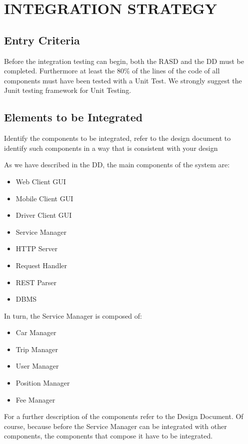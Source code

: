 \section{INTEGRATION STRATEGY}
\subsection{Entry Criteria} 
Before the integration testing can begin, both the RASD and the DD must be completed. Furthermore at least the 80\% of the lines of the code of all components must have been tested with a Unit Test. We strongly suggest the Junit testing framework for Unit Testing.
\subsection{Elements to be Integrated} Identify the components to be integrated, refer to the design document to identify such components in a way that is consistent with your design
\newline 

As we have described in the DD, the main components of the system are:
\begin{itemize}
\item Web Client GUI
\item Mobile Client GUI
\item Driver Client GUI
\item Service Manager 
\item HTTP Server
\item Request Handler
\item REST Parser
\item DBMS
\end{itemize}

In turn, the Service Manager is composed of:
\begin{itemize}
\item Car Manager
\item Trip Manager
\item User Manager
\item Position Manager
\item Fee Manager
\end{itemize}
\noindent
For a further description of the components refer to the Design Document. 
\newline 
Of course, because before the Service Manager can be integrated with other components, the components that compose it have to be integrated.


